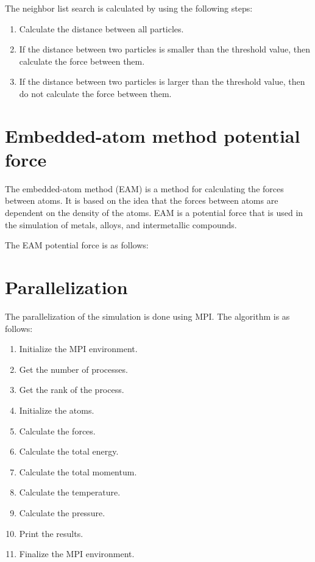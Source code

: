     The neighbor list search is calculated by using the following steps:
    \begin{enumerate}
        \item Calculate the distance between all particles.
        \item If the distance between two particles is smaller than the threshold value, then calculate the force between them.
        \item If the distance between two particles is larger than the threshold value, then do not calculate the force between them.
    \end{enumerate}

\section{Embedded-atom method potential force}
    The embedded-atom method (EAM) is a method for calculating the forces between atoms. It is based on the idea that the forces between atoms are dependent on the density of the atoms. EAM is a potential force that is used in the simulation of metals, alloys, and intermetallic compounds.
    
    
    The EAM potential force is as follows:



\section{Parallelization}
    The parallelization of the simulation is done using MPI. The algorithm is as follows:
    \begin{enumerate}
        \item Initialize the MPI environment.
        \item Get the number of processes.
        \item Get the rank of the process.
        \item Initialize the atoms.
        \item Calculate the forces.
        \item Calculate the total energy.
        \item Calculate the total momentum.
        \item Calculate the temperature.
        \item Calculate the pressure.
        \item Print the results.
        \item Finalize the MPI environment.
    \end{enumerate}
